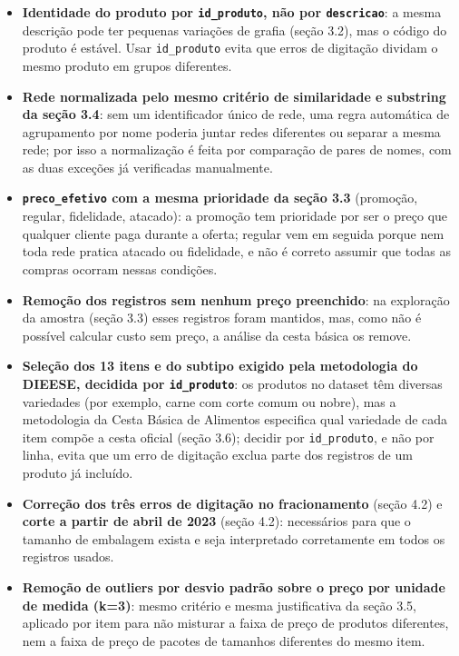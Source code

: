 \documentclass[11pt,a4paper]{article}
\newcommand{\col}[1]{\texttt{#1}}
\begin{document}
\begin{itemize}[itemsep=2pt, topsep=2pt]
  \item \textbf{Identidade do produto por \col{id\_produto}, não por \col{descricao}}: a mesma descrição pode ter pequenas variações de grafia (seção 3.2), mas o código do produto é estável. Usar \col{id\_produto} evita que erros de digitação dividam o mesmo produto em grupos diferentes.
  \item \textbf{Rede normalizada pelo mesmo critério de similaridade e substring da seção 3.4}: sem um identificador único de rede, uma regra automática de agrupamento por nome poderia juntar redes diferentes ou separar a mesma rede; por isso a normalização é feita por comparação de pares de nomes, com as duas exceções já verificadas manualmente.
  \item \textbf{\col{preco\_efetivo} com a mesma prioridade da seção 3.3} (promoção, regular, fidelidade, atacado): a promoção tem prioridade por ser o preço que qualquer cliente paga durante a oferta; regular vem em seguida porque nem toda rede pratica atacado ou fidelidade, e não é correto assumir que todas as compras ocorram nessas condições.
  \item \textbf{Remoção dos registros sem nenhum preço preenchido}: na exploração da amostra (seção 3.3) esses registros foram mantidos, mas, como não é possível calcular custo sem preço, a análise da cesta básica os remove.
  \item \textbf{Seleção dos 13 itens e do subtipo exigido pela metodologia do DIEESE, decidida por \col{id\_produto}}: os produtos no dataset têm diversas variedades (por exemplo, carne com corte comum ou nobre), mas a metodologia da Cesta Básica de Alimentos especifica qual variedade de cada item compõe a cesta oficial (seção 3.6); decidir por \col{id\_produto}, e não por linha, evita que um erro de digitação exclua parte dos registros de um produto já incluído.
  \item \textbf{Correção dos três erros de digitação no fracionamento} (seção 4.2) e \textbf{corte a partir de abril de 2023} (seção 4.2): necessários para que o tamanho de embalagem exista e seja interpretado corretamente em todos os registros usados.
  \item \textbf{Remoção de outliers por desvio padrão sobre o preço por unidade de medida (k=3)}: mesmo critério e mesma justificativa da seção 3.5, aplicado por item para não misturar a faixa de preço de produtos diferentes, nem a faixa de preço de pacotes de tamanhos diferentes do mesmo item.
\end{itemize}
\end{document}
